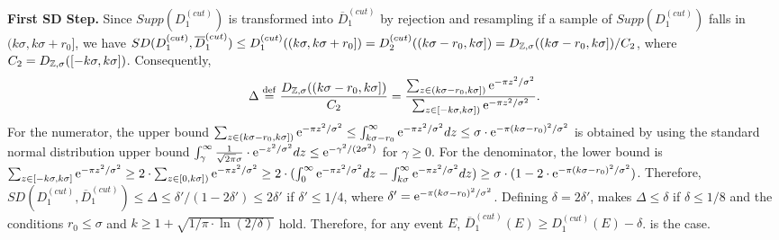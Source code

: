 \begin{sloppypar}
  \textbf{First SD Step.} Since $Supp(D_1^{(cut)})$ is transformed into
  $\overline{D}_1^{(cut)}$ by rejection and resampling if a sample of
  $Supp(D_1^{(cut)})$ falls in $(k\sigma,k\sigma+r_0]$, we have
  $SD(D_1^{(cut)}, \overline{D}_1^{(cut)}) \leq
  D_1^{(cut)}((k\sigma,k\sigma+r_0]) = D_2^{(cut)}((k\sigma-r_0,k\sigma]) =
  D_{\mathbb{Z},\sigma}((k\sigma-r_0,k\sigma])/C_2$, where
  $C_2 = D_{\mathbb{Z},\sigma}([-k\sigma,k\sigma])$. Consequently,
$$
\Delta \stackrel{\mathrm{def}}{=} \frac{D_{\mathbb{Z},\sigma}((k\sigma-r_0,k\sigma])}{C_2} = \frac{\sum_{z
    \in (k\sigma-r_0,k\sigma])} \mathrm{e}^{-\pi z^2/\sigma^2}}{\sum_{z \in
    [-k\sigma,k\sigma])} \mathrm{e}^{-\pi z^2/\sigma^2}}.
$$
For the numerator, the upper bound
$\sum_{z \in (k\sigma-r_0,k\sigma])} \mathrm{e}^{-\pi z^2/\sigma^2} \leq
\int^{\infty}_{k\sigma-r_0} \mathrm{e}^{-\pi z^2/\sigma^2} dz \leq \sigma \cdot \mathrm{e}^{-\pi
  (k\sigma-r_0)^2/\sigma^2}$ is obtained by using the standard normal distribution upper bound
$\int^{\infty}_{\gamma} \frac{1}{\sqrt{2\pi} \sigma} \cdot \mathrm{e}^{- z^2/\sigma^2}
dz \leq \mathrm{e}^{-\gamma^2/(2\sigma^2)}$ for $\gamma \geq 0$. For the denominator, the lower bound is
$\sum_{z \in [-k\sigma,k\sigma]} \mathrm{e}^{-\pi z^2/\sigma^2} \geq 2 \cdot \sum_{z \in
  [0,k\sigma])} \mathrm{e}^{-\pi z^2/\sigma^2} \geq 2 \cdot (\int^{\infty}_{0} \mathrm{e}^{-\pi
  z^2/\sigma^2} dz - \int^{\infty}_{k\sigma} \mathrm{e}^{-\pi z^2/\sigma^2} dz) \geq
\sigma \cdot (1 - 2 \cdot \mathrm{e}^{-\pi (k\sigma-r_0)^2/\sigma^2})$. Therefore,
$SD(D_1^{(cut)}, \overline{D}_1^{(cut)}) \leq \Delta \leq \delta' / (1-2\delta')
\leq 2\delta'$ if $\delta' \leq 1/4$, where
$\delta' = \mathrm{e}^{-\pi (k\sigma-r_0)^2/\sigma^2}$. Defining $\delta = 2\delta'$, makes $\Delta \leq \delta$ if $\delta \leq 1/8$ and the conditions
$r_0 \leq \sigma$ and $k \geq 1 + \sqrt{1/\pi \cdot \ln(2/\delta)}$
hold. Therefore, for any event $E$, 
$\overline{D}_1^{(cut)}(E) \geq D_1^{(cut)}(E) - \delta$. is the case.
\end{sloppypar}

